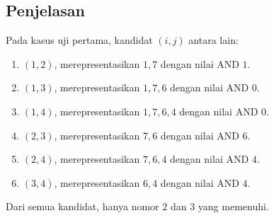 \documentclass{article}
\begin{document}
\subsection*{Penjelasan}
Pada kasus uji pertama, kandidat $(i, j)$ antara lain:

\begin{enumerate}
    \setlength\itemsep{0pt}
    \item $(1, 2)$, merepresentasikan $1, 7$ dengan nilai AND $1$.
    \item $(1, 3)$, merepresentasikan $1, 7, 6$ dengan nilai AND $0$.
    \item $(1, 4)$, merepresentasikan $1, 7, 6, 4$ dengan nilai AND $0$.
    \item $(2, 3)$, merepresentasikan $7, 6$ dengan nilai AND $6$.
    \item $(2, 4)$, merepresentasikan $7, 6, 4$ dengan nilai AND $4$.
    \item $(3, 4)$, merepresentasikan $6, 4$ dengan nilai AND $4$.
\end{enumerate}

Dari semua kandidat, hanya nomor $2$ dan $3$ yang memenuhi.

\pagebreak
\end{document}
